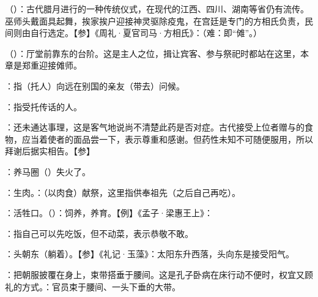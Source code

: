{
\item {}（）：古代腊月进行的一种传统仪式，在现代的江西、四川、湖南等省仍有流传。巫师头戴面具起舞，挨家挨户迎接神灵驱除疫鬼，在宫廷是专门的方相氏负责，民间则由自行选定。【参】《周礼·夏官司马·方相氏》：（难：即“傩”。）
\item {}（）：厅堂前靠东的台阶。这是主人之位，揖让宾客、参与祭祀时都站在这里，本章是郑重迎接傩师。
}
{}


{
\item {}：指（托人）向远在别国的亲友（带去）问候。
\item {}：指受托传话的人。
}
{}


{
\item {}：还未通达事理，这是客气地说尚不清楚此药是否对症。古代接受上位者赠与的食物，应当着使者的面品尝一下，表示尊重和感谢。但药性未知不可随便服用，所以拜谢后据实相告。【参】
}
{}


{
\item {}：养马圈（）失火了。
}
{}


{
\item {}：生肉。：（以肉食）献祭，这里指供奉祖先（之后自己再吃）。
\item {}：活牲口。（）：饲养，养育。【例】《孟子·梁惠王上》：
\item {}：指自己可以先吃饭，但不动菜，表示恭敬不敢。
}
{}


{
\item {}：头朝东（躺着）。【参】《礼记·玉藻》：太阳东升西落，头向东是接受阳气。
\item {}：把朝服披覆在身上，束带搭垂于腰间。这是孔子卧病在床行动不便时，权宜又顾礼的方式。：官员束于腰间、一头下垂的大带。
}
{}



